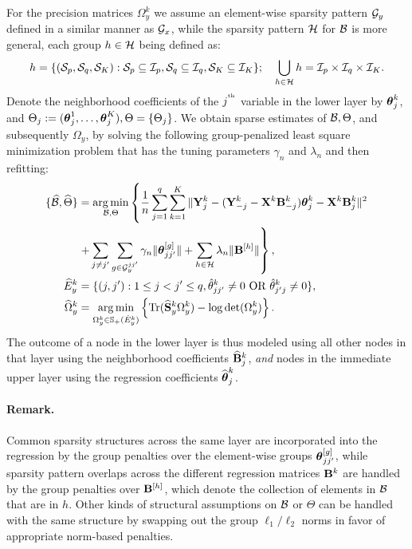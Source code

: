 For the precision matrices $\Omega_y^k$ we assume an element-wise sparsity pattern ${\cal{G}}_y$ defined in a similar manner as ${\cal{G}}_x$, while the sparsity pattern ${\cal{H}}$ for ${\cal{B}}$ is more general, each group $h \in {\cal{H}}$ being defined as:
%
$$
h = \{ ({\cal{S}}_p, {\cal{S}}_q, {\cal{S}}_K): {\cal{S}}_p \subseteq {\cal{I}}_p, {\cal{S}}_q \subseteq {\cal{I}}_q, {\cal{S}}_K \subseteq {\cal{I}}_K \}
; \quad \bigcup_{h \in {\cal{H}}} h = {\cal{I}}_p \times {\cal{I}}_q \times {\cal{I}}_K.
$$
%
Denote the neighborhood coefficients of the $j^{\operatorname*{^{\text{th}}}}$ variable in the lower layer by ${\boldsymbol{\theta}}_j^k$, and $\Theta_j := ({\boldsymbol{\theta}}_j^1, \ldots, {\boldsymbol{\theta}}_j^K), \Theta = \{ \Theta_j \}$. We obtain sparse estimates of ${\cal{B}}, \Theta$, and subsequently $\Omega_y$, by solving the following group-penalized least square minimization problem that has the tuning parameters $\gamma_n$ and $\lambda_n$ and then refitting:
%
\begin{align}
\{ \widehat {{\cal{B}}}, \widehat \Theta \} &= 
\operatorname*{arg\,min}_{{\cal{B}}, \Theta} \left\{ \frac{1}{n} \sum_{j=1}^q \sum_{k=1}^K \| {\mathbf{Y}}^k_j - ({\mathbf{Y}}_{-j}^k - {\mathbf{X}}^k {\mathbf{B}}_{-j}^k) {\boldsymbol{\theta}}_j^k - {\mathbf{X}}^k {\mathbf{B}}_j^k \|^2 \right. \notag\\
& \left. + \sum_{j \neq j'} \sum_{g \in {\cal{G}}_y^{jj'}} \gamma_n \| {\boldsymbol{\theta}}_{jj'}^{[g]} \| + \sum_{h \in {\cal{H}}} \lambda_n \| {\mathbf{B}}^{[h]} \| \right\}, \label{eqn:jmmle-objfun}\\
\widehat E_y^k &= \{(j,j'): 1 \leq j < j' \leq q, \hat \theta_{jj'}^k \neq 0 \text{ OR } \hat \theta_{j'j}^k \neq 0 \}, \notag\\
\widehat \Omega_y^k &= \operatorname*{arg\,min}_{\Omega_y^k \in {\mathbb{S}}_+ (\hat E_y^k)}
\left\{ \operatorname*{Tr} (\widehat {{\mathbf{S}}}_y^k \Omega_y^k ) - \log \det (\Omega_y^k) \right\}. \label{eqn:omega-y-calc}
\end{align}
%
The outcome of a node in the lower layer is thus modeled using all other nodes in that layer using the neighborhood coefficients $\widehat {{\mathbf{B}}}_j^k$, {\it and} nodes in the immediate upper layer using the regression coefficients $\widehat {{\boldsymbol{\theta}}}_j^k$.

\paragraph{Remark.} Common sparsity structures across the same layer are incorporated into the regression by the group penalties over the element-wise groups ${\boldsymbol{\theta}}_{jj'}^{[g]}$, while sparsity pattern overlaps across the different regression matrices ${\mathbf{B}}^k$ are handled by the group penalties over ${\mathbf{B}}^{[h]}$, which denote the collection of elements in ${\cal{B}}$ that are in $h$. Other kinds of structural assumptions on ${\cal{B}}$ or $\Theta$ can be handled with the same structure by swapping out the group $\ell_1/\ell_2$ norms in favor of appropriate norm-based penalties.

